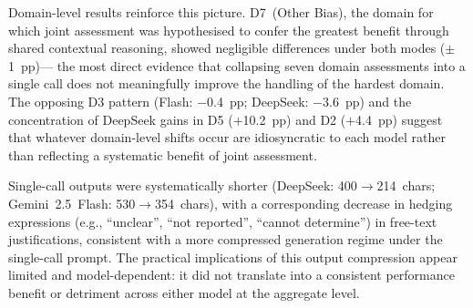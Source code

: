 \documentclass[../main.tex]{subfiles}
\begin{document}
Domain-level results reinforce this picture.
D7~(Other Bias), the domain for which joint assessment was
hypothesised to confer the greatest benefit through shared contextual
reasoning, showed negligible differences under both modes ($\pm$1~pp)---
the most direct evidence that collapsing seven domain assessments into a single
call does not meaningfully improve the handling of the hardest domain.
The opposing D3 pattern (Flash: $-$0.4~pp; DeepSeek: $-$3.6~pp) and the
concentration of DeepSeek gains in D5 ($+$10.2~pp) and D2 ($+$4.4~pp)
suggest that whatever domain-level shifts occur are idiosyncratic to each
model rather than reflecting a systematic benefit of joint assessment.

Single-call outputs were systematically shorter (DeepSeek: 400$\to$214~chars;
Gemini~2.5~Flash: 530$\to$354~chars), with a corresponding decrease in hedging
expressions (e.g., ``unclear'', ``not reported'', ``cannot determine'') in
free-text justifications, consistent with a more compressed generation
regime under the single-call prompt.
The practical implications of this output compression appear limited and
model-dependent: it did not translate into a consistent performance benefit or
detriment across either model at the aggregate level.
\end{document}
